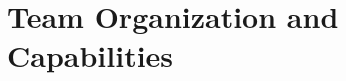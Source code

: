 \documentclass[letterpaper,12pt]{article}
\begin{document}
\section{Team Organization and Capabilities}

\nocite{*}
\pagebreak


\end{document}
